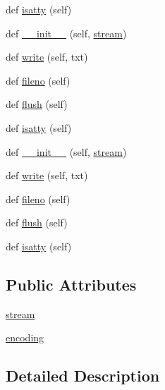 \begin{DoxyCompactItemize}
def \hyperlink{classwaflib_1_1_logs_1_1sync__stream_ab2c7f6c6ed9124156995bf1afd32f4e8}{isatty} (self)
\item 
def \hyperlink{classwaflib_1_1_logs_1_1sync__stream_acb5884a14ea3783d42b6e85d0c7cec37}{\+\_\+\+\_\+init\+\_\+\+\_\+} (self, \hyperlink{classwaflib_1_1_logs_1_1sync__stream_aded1f86a06bb9629cf84510dfb0e10fd}{stream})
\item 
def \hyperlink{classwaflib_1_1_logs_1_1sync__stream_aeadb7ea2e4d720db84895bf5544f8631}{write} (self, txt)
\item 
def \hyperlink{classwaflib_1_1_logs_1_1sync__stream_a6edc1da128e5a27c857335a360408654}{fileno} (self)
\item 
def \hyperlink{classwaflib_1_1_logs_1_1sync__stream_a27a7cd9b26568e66f4a5a8e640dfc67a}{flush} (self)
\item 
def \hyperlink{classwaflib_1_1_logs_1_1sync__stream_ab2c7f6c6ed9124156995bf1afd32f4e8}{isatty} (self)
\item 
def \hyperlink{classwaflib_1_1_logs_1_1sync__stream_acb5884a14ea3783d42b6e85d0c7cec37}{\+\_\+\+\_\+init\+\_\+\+\_\+} (self, \hyperlink{classwaflib_1_1_logs_1_1sync__stream_aded1f86a06bb9629cf84510dfb0e10fd}{stream})
\item 
def \hyperlink{classwaflib_1_1_logs_1_1sync__stream_aeadb7ea2e4d720db84895bf5544f8631}{write} (self, txt)
\item 
def \hyperlink{classwaflib_1_1_logs_1_1sync__stream_a6edc1da128e5a27c857335a360408654}{fileno} (self)
\item 
def \hyperlink{classwaflib_1_1_logs_1_1sync__stream_a27a7cd9b26568e66f4a5a8e640dfc67a}{flush} (self)
\item 
def \hyperlink{classwaflib_1_1_logs_1_1sync__stream_ab2c7f6c6ed9124156995bf1afd32f4e8}{isatty} (self)
\end{DoxyCompactItemize}
\subsection*{Public Attributes}
\begin{DoxyCompactItemize}
\item 
\hyperlink{classwaflib_1_1_logs_1_1sync__stream_aded1f86a06bb9629cf84510dfb0e10fd}{stream}
\item 
\hyperlink{classwaflib_1_1_logs_1_1sync__stream_aafa2bfd75e261f4e170a2d3866c2bd4c}{encoding}
\end{DoxyCompactItemize}


\subsection{Detailed Description}


